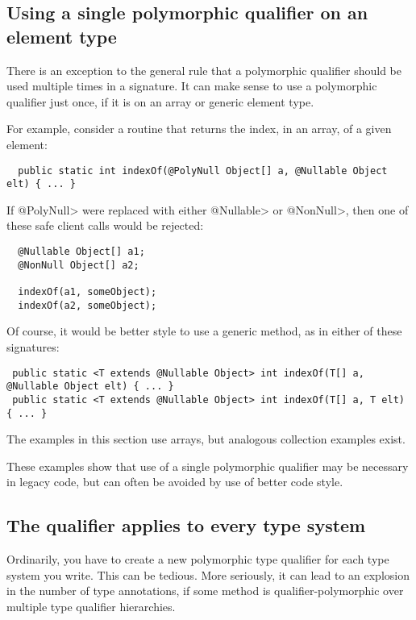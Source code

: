 \subsection{Using a single polymorphic qualifier on an element type\label{qualifier-polymorphism-element-types}}

There is an exception to the general rule that a polymorphic qualifier
should be used multiple times in a signature.  It can make sense to use a
polymorphic qualifier just once, if it is on an array or generic element
type.

For example, consider a routine that returns the index, in an array, of a
given element:

\begin{Verbatim}
  public static int indexOf(@PolyNull Object[] a, @Nullable Object elt) { ... }
\end{Verbatim}

If \<@PolyNull> were replaced with either \<@Nullable> or \<@NonNull>, then
one of these safe client calls would be rejected:

\begin{Verbatim}
  @Nullable Object[] a1;
  @NonNull Object[] a2;

  indexOf(a1, someObject);
  indexOf(a2, someObject);
\end{Verbatim}

Of course, it would be better style to use a generic method, as in either
of these signatures:

\begin{Verbatim}
 public static <T extends @Nullable Object> int indexOf(T[] a, @Nullable Object elt) { ... }
 public static <T extends @Nullable Object> int indexOf(T[] a, T elt) { ... }
\end{Verbatim}

The examples in this section use arrays, but analogous collection examples exist.

These examples show that use of a single polymorphic qualifier may be
necessary in legacy code, but can often be avoided by use of better code
style.


\subsection{The  qualifier applies to every type system\label{polyall}}

Ordinarily, you have to create a new polymorphic type qualifier for each
type system you write.  This can be tedious.  More seriously, it can lead
to an explosion in the number of type annotations, if some method is
qualifier-polymorphic over multiple type qualifier hierarchies.

